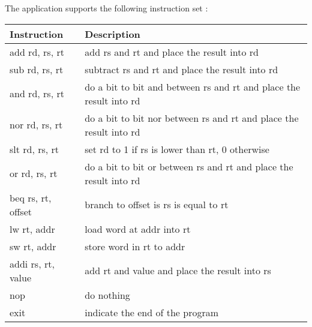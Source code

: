 The application supports the following instruction set :
\begin{table}[H]
\centering
\begin{tabular}{|l|l|}
\hline 
\textbf{Instruction} & \textbf{Description} \\ 
\hline 
add rd, rs, rt & add rs and rt and place the result into rd \\ 
\hline 
sub rd, rs, rt & subtract rs and rt and place the result into rd \\ 
\hline 
and rd, rs, rt & do a bit to bit and between rs and rt and place the result into rd \\ 
\hline 
nor rd, rs, rt & do a bit to bit nor between rs and rt and place the result into rd \\ 
\hline 
slt rd, rs, rt & set rd to 1 if rs is lower than rt, 0 otherwise \\ 
\hline 
or rd, rs, rt & do a bit to bit or between rs and rt and place the result into rd \\ 
\hline 
beq rs, rt, offset & branch to offset is rs is equal to rt \\ 
\hline 
lw rt, addr  & load word at addr into rt \\ 
\hline 
sw rt, addr & store word in rt to addr \\ 
\hline 
addi rs, rt, value & add rt and value and place the result into rs \\ 
\hline 
nop & do nothing \\ 
\hline 
exit & indicate the end of the program \\ 
\hline 
\end{tabular} 
\end{table}